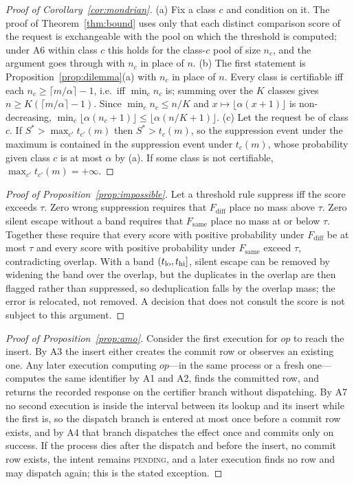\begin{proof}[Proof of Corollary~\ref{cor:mondrian}]
(a) Fix a class $c$ and condition on it. The proof of Theorem~\ref{thm:bound} uses only that each distinct comparison score of the request is exchangeable with the pool on which the threshold is computed; under A6 within class $c$ this holds for the class-$c$ pool of size $n_c$, and the argument goes through with $n_c$ in place of $n$. (b) The first statement is Proposition~\ref{prop:dilemma}(a) with $n_c$ in place of $n$. Every class is certifiable iff each $n_c\ge\lceil m/\alpha\rceil-1$, i.e.\ iff $\min_c n_c$ is; summing over the $K$ classes gives $n\ge K(\lceil m/\alpha\rceil-1)$. Since $\min_c n_c\le n/K$ and $x\mapsto\lfloor\alpha(x+1)\rfloor$ is non-decreasing, $\min_c\lfloor\alpha(n_c+1)\rfloor\le\lfloor\alpha(n/K+1)\rfloor$. (c) Let the request be of class $c$. If $S^\ast>\max_{c'}t_{c'}(m)$ then $S^\ast>t_c(m)$, so the suppression event under the maximum is contained in the suppression event under $t_c(m)$, whose probability given class $c$ is at most $\alpha$ by (a). If some class is not certifiable, $\max_{c'}t_{c'}(m)=+\infty$.
\end{proof}

\begin{proof}[Proof of Proposition~\ref{prop:impossible}]
Let a threshold rule suppress iff the score exceeds $\tau$. Zero wrong suppression requires that $F_{\mathrm{diff}}$ place no mass above $\tau$. Zero silent escape without a band requires that $F_{\mathrm{same}}$ place no mass at or below $\tau$. Together these require that every score with positive probability under $F_{\mathrm{diff}}$ be at most $\tau$ and every score with positive probability under $F_{\mathrm{same}}$ exceed $\tau$, contradicting overlap. With a band $(t_{\mathrm{lo}},t_{\mathrm{hi}}]$, silent escape can be removed by widening the band over the overlap, but the duplicates in the overlap are then flagged rather than suppressed, so deduplication falls by the overlap mass; the error is relocated, not removed. A decision that does not consult the score is not subject to this argument.
\end{proof}

\begin{proof}[Proof of Proposition~\ref{prop:amo}]
Consider the first execution for $\mathit{op}$ to reach the insert. By A3 the insert either creates the commit row or observes an existing one. Any later execution computing $\mathit{op}$---in the same process or a fresh one---computes the same identifier by A1 and A2, finds the committed row, and returns the recorded response on the certifier branch without dispatching. By A7 no second execution is inside the interval between its lookup and its insert while the first is, so the dispatch branch is entered at most once before a commit row exists, and by A4 that branch dispatches the effect once and commits only on success. If the process dies after the dispatch and before the insert, no commit row exists, the intent remains \textsc{pending}, and a later execution finds no row and may dispatch again; this is the stated exception.
\end{proof}

